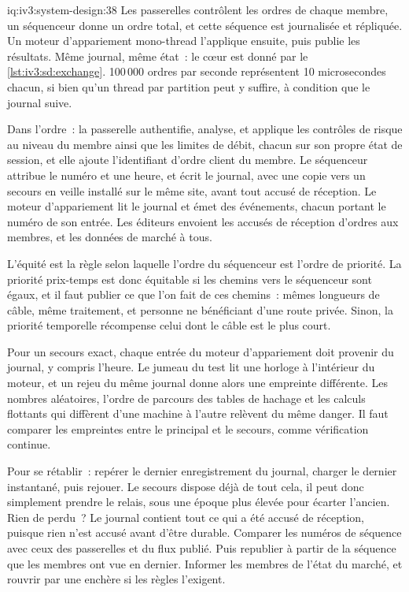 \begin{solution}{iq:iv3:system-design:38}
Les passerelles contrôlent les ordres de chaque membre, un séquenceur donne un ordre total, et cette séquence est journalisée et répliquée. Un moteur d'appariement mono-thread l'applique ensuite, puis publie les résultats. Même journal, même état~: le cœur est donné par le \cref{lst:iv3:sd:exchange}. 100\,000 ordres par seconde représentent 10 microsecondes chacun, si bien qu'un thread par partition peut y suffire, à condition que le journal suive.
\label{lst:iv3:sd:exchange}

Dans l'ordre~: la passerelle authentifie, analyse, et applique les contrôles de risque au niveau du membre ainsi que les limites de débit, chacun sur son propre état de session, et elle ajoute l'identifiant d'ordre client du membre. Le séquenceur attribue le numéro et une heure, et écrit le journal, avec une copie vers un secours en veille installé sur le même site, avant tout accusé de réception. Le moteur d'appariement lit le journal et émet des événements, chacun portant le numéro de son entrée. Les éditeurs envoient les accusés de réception d'ordres aux membres, et les données de marché à tous.

L'équité est la règle selon laquelle l'ordre du séquenceur est l'ordre de priorité. La priorité prix-temps est donc équitable si les chemins vers le séquenceur sont égaux, et il faut publier ce que l'on fait de ces chemins~: mêmes longueurs de câble, même traitement, et personne ne bénéficiant d'une route privée. Sinon, la priorité temporelle récompense celui dont le câble est le plus court.

Pour un secours exact, chaque entrée du moteur d'appariement doit provenir du journal, y compris l'heure. Le jumeau du test lit une horloge à l'intérieur du moteur, et un rejeu du même journal donne alors une empreinte différente. Les nombres aléatoires, l'ordre de parcours des tables de hachage et les calculs flottants qui diffèrent d'une machine à l'autre relèvent du même danger. Il faut comparer les empreintes entre le principal et le secours, comme vérification continue.

Pour se rétablir~: repérer le dernier enregistrement du journal, charger le dernier instantané, puis rejouer. Le secours dispose déjà de tout cela, il peut donc simplement prendre le relais, sous une époque plus élevée pour écarter l'ancien. Rien de perdu~? Le journal contient tout ce qui a été accusé de réception, puisque rien n'est accusé avant d'être durable. Comparer les numéros de séquence avec ceux des passerelles et du flux publié. Puis republier à partir de la séquence que les membres ont vue en dernier. Informer les membres de l'état du marché, et rouvrir par une enchère si les règles l'exigent.


\end{solution}
